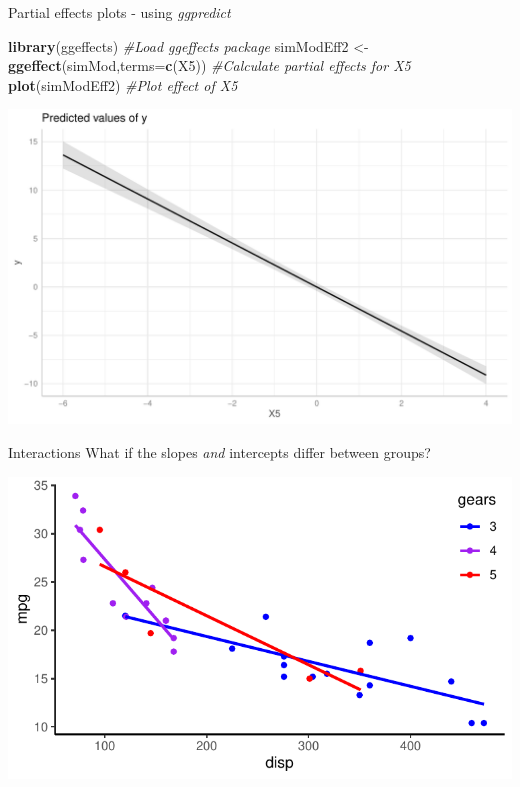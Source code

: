 \documentclass[
  ignorenonframetext,
  aspectratio=169]{beamer}
\newenvironment{Shaded}{\begin{snugshade}}{\end{snugshade}}
\newcommand{\AttributeTok}[1]{\textcolor[rgb]{0.13,0.29,0.53}{#1}}
\newcommand{\CommentTok}[1]{\textcolor[rgb]{0.56,0.35,0.01}{\textit{#1}}}
\newcommand{\FunctionTok}[1]{\textcolor[rgb]{0.13,0.29,0.53}{\textbf{#1}}}
\newcommand{\NormalTok}[1]{#1}
\newcommand{\OtherTok}[1]{\textcolor[rgb]{0.56,0.35,0.01}{#1}}
\newcommand{\StringTok}[1]{\textcolor[rgb]{0.31,0.60,0.02}{#1}}
\let\oldShaded\Shaded %
\let\endoldShaded\endShaded
\renewenvironment{Shaded}{\scriptsize\oldShaded}{\endoldShaded}
\begin{document}
\begin{frame}[fragile]{Partial effects plots - using \emph{ggpredict}}
\protect\hypertarget{partial-effects-plots---using-ggpredict}{}
\tiny

\begin{Shaded}
\begin{Highlighting}[]
\FunctionTok{library}\NormalTok{(ggeffects) }\CommentTok{\#Load ggeffects package}
\NormalTok{simModEff2 }\OtherTok{\textless{}{-}} \FunctionTok{ggeffect}\NormalTok{(simMod,}\AttributeTok{terms=}\FunctionTok{c}\NormalTok{(}\StringTok{\textquotesingle{}X5\textquotesingle{}}\NormalTok{)) }\CommentTok{\#Calculate partial effects for X5}
\FunctionTok{plot}\NormalTok{(simModEff2) }\CommentTok{\#Plot effect of X5}
\end{Highlighting}
\end{Shaded}

\includegraphics{03-Lecture_files/figure-beamer/unnamed-chunk-19-1.pdf}
\end{frame}

\begin{frame}{Interactions}
\protect\hypertarget{interactions}{}
What if the slopes \emph{and} intercepts differ between groups?

\includegraphics{03-Lecture_files/figure-beamer/unnamed-chunk-20-1.pdf}
\end{frame}
\end{document}
